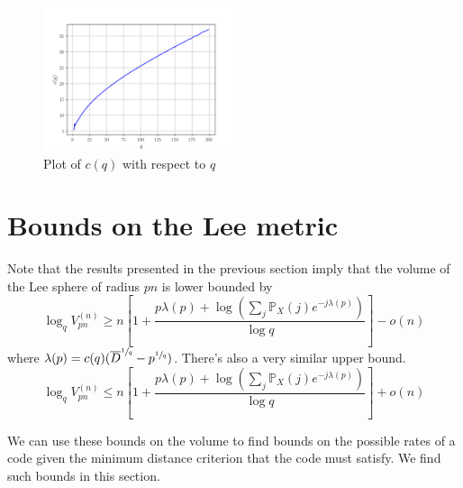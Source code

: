 \documentclass[conference,letterpaper]{IEEEtran}
\begin{document}
\begin{figure}[htbp]
    \centering
    \includegraphics[width=0.5\textwidth]{cqwithq}
    \caption{Plot of $c(q)$ with respect to $q$}
    \label{fig:sim}
\end{figure}
\vspace{3mm}
\section{Bounds on the Lee metric}\label{Lee metric bounds}
Note that the results presented in the previous section imply that the volume of the Lee sphere of radius $pn$ is lower bounded by 
\begin{equation}\label{lee size}
    \log_q V_{pn}^{(n)} \geq n \left[1 + \frac{p \lambda(p) + \log \left(\sum_j \mathbb{P}_X(j) e^{-j \lambda(p)}\right)}{\log q}\right] - o(n)
\end{equation}
where $\lambda(p) = c(q)(\overline{D}^{\sfrac{1}{q}} - p^{\sfrac{1}{q}})$. There's also a very similar upper bound.
\begin{equation}
    \log_q V_{pn}^{(n)} \leq n \left[1 + \frac{p \lambda(p) + \log \left(\sum_j \mathbb{P}_X(j) e^{-j \lambda(p)}\right)}{\log q}\right] + o(n)
\end{equation}

We can use these bounds on the volume to find bounds on the possible rates of a code given the minimum distance criterion that the code must satisfy. We find such bounds in this section. 
\end{document}
